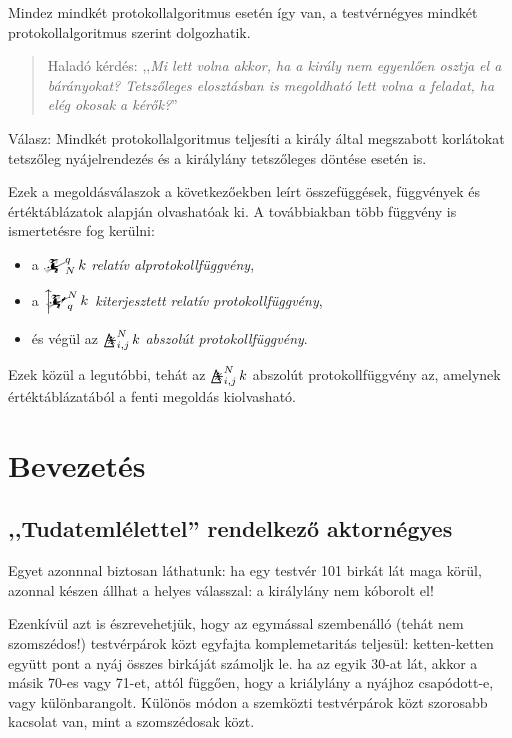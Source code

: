 \documentclass{article}
\newcommand{\eye}{\bigtriangleup\mspace{-14.607mu}\divideontimes}
\newcommand{\eyefun}[4]{\mathop{\eye}^{#1}_{#2,#3}#4}
\newcommand{\mainfun}[3]{\mathwitch_{#1}^{#2}#3}
\newcommand{\mainfunext}[3]{\left\uparrow\!\!\!\mathwitch*_{#2}^{#1}#3\right.}
\begin{document}
	Mindez mindkét protokollalgoritmus esetén így van, a testvérnégyes mindkét protokollalgoritmus szerint dolgozhatik.
	
	\begin{quotation}
		Haladó kérdés: ,,\textit{Mi lett volna akkor, ha a király nem egyenlően osztja el a bárányokat? Tetszőleges elosztásban is megoldható lett volna a feladat, ha elég okosak a kérők?}''
	\end{quotation}

	Válasz: Mindkét protokollalgoritmus teljesíti a király által megszabott korlátokat tetszőleg nyájelrendezés és a királylány tetszőleges döntése esetén is.

	Ezek a megoldásválaszok a következőekben leírt összefüggések, függvények és értéktáblázatok alapján olvashatóak ki. A továbbiakban több függvény is ismertetésre fog kerülni:
	\begin{itemize}
		\item a $\mainfun Nqk$ \emph{relatív alprotokollfüggvény},
		\item a $\mainfunext Nqk$ \emph{kiterjesztett relatív protokollfüggvény},
		\item és végül az $\eyefun Nijk$ \emph{abszolút protokollfüggvény}.
	\end{itemize}
	Ezek közül a legutóbbi, tehát az  $\eyefun Nijk$ abszolút protokollfüggvény az, amelynek értéktáblázatából a fenti megoldás kiolvasható.

	\section{Bevezetés}

	\subsection{,,Tudatemlélettel'' rendelkező aktornégyes}

	Egyet azonnnal biztosan láthatunk: ha egy testvér 101 birkát lát maga körül, azonnal készen állhat a helyes válasszal: a királylány nem kóborolt el!

	Ezenkívül azt is észrevehetjük, hogy az egymással szembenálló (tehát nem szomszédos!) testvérpárok közt egyfajta komplemetaritás teljesül: ketten-ketten együtt pont a nyáj összes birkáját számoljk le. ha az egyik 30-at lát, akkor a másik 70-es vagy 71-et, attól függően, hogy a kriálylány a nyájhoz csapódott-e, vagy különbarangolt. Különös módon a szemközti testvérpárok közt szorosabb kacsolat van, mint a szomszédosak közt.
\end{document}
